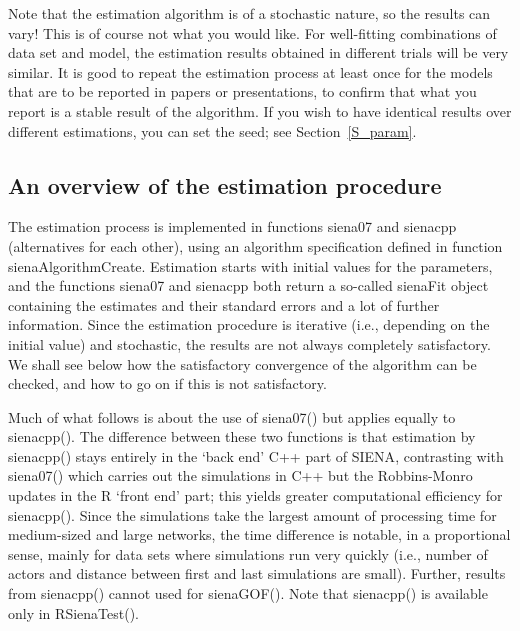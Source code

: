 \documentclass[a4paper,fleqn,11pt]{article}
\newcommand{\+}{\, + \,}
\newcommand{\sfn}[1]{\textsf{#1}}
\newcommand{\si}{{\sf SIENA}}
\begin{document}
Note that the estimation algorithm is of a stochastic nature, so
the results can vary! This is of course not what you would like.
For well-fitting combinations of data set and model, the
estimation results obtained in different trials will be very
similar. It is good to repeat the estimation process at least once
for the models that are to be reported in papers or presentations,
to confirm that what you report is a stable result of the algorithm.
If you wish to have identical results over different estimations,
you can set the seed; see Section~\ref{S_param}.

\subsection{An overview of the estimation procedure}
\hypertarget{T_S_options}{   }

The estimation process is implemented in functions \sfn{siena07}
and \sfn{sienacpp} (alternatives for each other),
using an algorithm specification defined in function \sfn{sienaAlgorithmCreate}.
Estimation starts with initial values for the parameters,
and the functions \sfn{siena07} and \sfn{sienacpp} both return a
so-called \textsf{sienaFit} object containing the estimates and their standard errors and
a lot of further information.
Since the estimation procedure is iterative (i.e., depending on the
initial value) and stochastic,
the results are not always completely satisfactory. We shall see below
how the satisfactory convergence of the algorithm can be checked,
and how to go on if this is not satisfactory.

Much of what follows is about the use of \sfn{siena07()}
but applies equally to \sfn{sienacpp()}.
The difference between these two functions is that
estimation by \sfn{sienacpp()} stays entirely in the
`back end' \sfn{C++} part of \si, contrasting with \sfn{siena07()}
which carries out the simulations in \sfn{C++} but the
Robbins-Monro updates in the \sfn{R} `front end' part;
this yields greater computational efficiency for \sfn{sienacpp()}.
Since the simulations take the largest amount of processing time
for medium-sized and large networks, the time difference is
notable, in a proportional sense, mainly for data sets
where simulations run very quickly (i.e., number of actors
and distance between first and last simulations are small).
Further, results from \sfn{sienacpp()} cannot used for
\sfn{sienaGOF()}.
Note that \sfn{sienacpp()} is available only in \sfn{RSienaTest()}.
\end{document}
